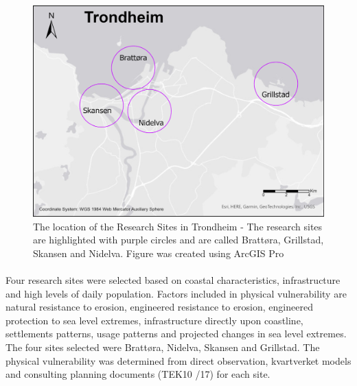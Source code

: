 \paragraph{}

\begin{figure} [h]
    \centering
    \includegraphics[width=1.0\textwidth]{fig/trondheim_research_sites_grey_circles.png}
    \caption{ The location of the Research Sites in Trondheim - The research sites are highlighted with purple circles and are called Brattøra, Grillstad, Skansen and Nidelva. Figure was created using ArcGIS Pro}
    \label{fig:research sites}
\end{figure}

\paragraph{}

Four research sites were selected based on coastal characteristics, infrastructure and high levels of daily population. Factors included in physical vulnerability are natural resistance to erosion, engineered resistance to erosion, engineered protection to sea level extremes, infrastructure directly upon coastline, settlements patterns, usage patterns and projected changes in sea level extremes. The four sites selected were Brattøra, Nidelva, Skansen and Grillstad. The physical vulnerability was determined from direct observation, kvartverket models and consulting planning documents (TEK10 /17) for each site. \cite{miljoenheten_og_byplankontoret_trondheim_kommune_9-notat-om-havnivastigning-og-stormflo---hensyn-i-arealplanlegging-nyhavnapdf_2020}


